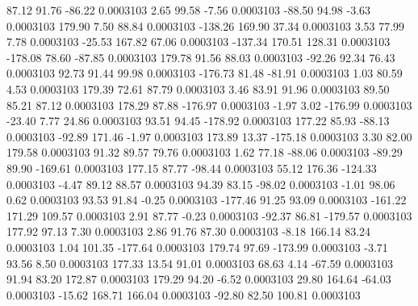        87.12       91.76      -86.22     0.0003103
        2.65       99.58       -7.56     0.0003103
      -88.50       94.98       -3.63     0.0003103
      179.90        7.50       88.84     0.0003103
     -138.26      169.90       37.34     0.0003103
        3.53       77.99        7.78     0.0003103
      -25.53      167.82       67.06     0.0003103
     -137.34      170.51      128.31     0.0003103
     -178.08       78.60      -87.85     0.0003103
      179.78       91.56       88.03     0.0003103
      -92.26       92.34       76.43     0.0003103
       92.73       91.44       99.98     0.0003103
     -176.73       81.48      -81.91     0.0003103
        1.03       80.59        4.53     0.0003103
      179.39       72.61       87.79     0.0003103
        3.46       83.91       91.96     0.0003103
       89.50       85.21       87.12     0.0003103
      178.29       87.88     -176.97     0.0003103
       -1.97        3.02     -176.99     0.0003103
      -23.40        7.77       24.86     0.0003103
       93.51       94.45     -178.92     0.0003103
      177.22       85.93      -88.13     0.0003103
      -92.89      171.46       -1.97     0.0003103
      173.89       13.37     -175.18     0.0003103
        3.30       82.00      179.58     0.0003103
       91.32       89.57       79.76     0.0003103
        1.62       77.18      -88.06     0.0003103
      -89.29       89.90     -169.61     0.0003103
      177.15       87.77      -98.44     0.0003103
       55.12      176.36     -124.33     0.0003103
       -4.47       89.12       88.57     0.0003103
       94.39       83.15      -98.02     0.0003103
       -1.01       98.06        0.62     0.0003103
       93.53       91.84       -0.25     0.0003103
     -177.46       91.25       93.09     0.0003103
     -161.22      171.29      109.57     0.0003103
        2.91       87.77       -0.23     0.0003103
      -92.37       86.81     -179.57     0.0003103
      177.92       97.13        7.30     0.0003103
        2.86       91.76       87.30     0.0003103
       -8.18      166.14       83.24     0.0003103
        1.04      101.35     -177.64     0.0003103
      179.74       97.69     -173.99     0.0003103
       -3.71       93.56        8.50     0.0003103
      177.33       13.54       91.01     0.0003103
       68.63        4.14      -67.59     0.0003103
       91.94       83.20      172.87     0.0003103
      179.29       94.20       -6.52     0.0003103
       29.80      164.64      -64.03     0.0003103
      -15.62      168.71      166.04     0.0003103
      -92.80       82.50      100.81     0.0003103
